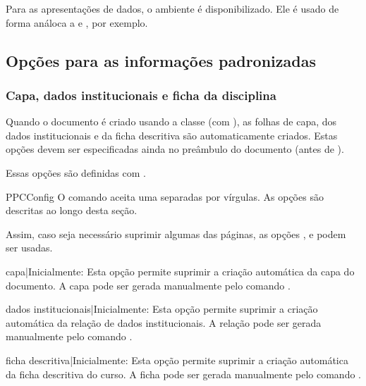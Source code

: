 \documentclass[a4paper, 11pt]{article}
\begin{document}
Para as apresentações de dados, o ambiente  é disponibilizado. Ele é usado de forma análoca a  e , por exemplo.

\subsection{Opções para as informações padronizadas}

\subsubsection*{Capa, dados institucionais e ficha da disciplina}
Quando o documento é criado usando a classe  (com ), as folhas de capa, dos dados institucionais e da ficha descritiva são automaticamente criados. Estas opções devem ser especificadas ainda no preâmbulo do documento (antes de \PDInline{\begin{document}}).

Essas opções são definidas com .

\begin{Macrodef}{PPCConfig}{}{}
    O comando  aceita uma  separadas por vírgulas. As opções são descritas ao longo desta seção.
\end{Macrodef}

Assim, caso seja necessário suprimir algumas das páginas, as opções ,  e  podem ser usadas.

\begin{Optiondef}{capa}{|}{Inicialmente: }
    Esta opção permite suprimir a criação automática da capa do documento. A capa pode ser gerada manualmente pelo comando .
\end{Optiondef}

\begin{Optiondef}{dados institucionais}{|}{Inicialmente: }
    Esta opção permite suprimir a criação automática da relação de dados institucionais. A relação pode ser gerada manualmente pelo comando .
\end{Optiondef}

\begin{Optiondef}{ficha descritiva}{|}{Inicialmente: }
    Esta opção permite suprimir a criação automática da ficha descritiva do curso. A ficha pode ser gerada manualmente pelo comando .
\end{Optiondef}
\end{document}
